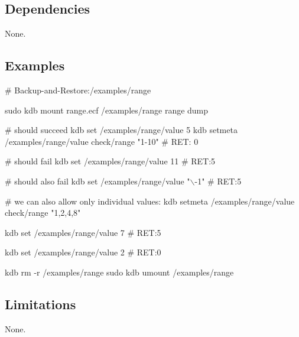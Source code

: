 \subsection*{Dependencies}

None.

\subsection*{Examples}


\begin{DoxyCode}
# Backup-and-Restore:/examples/range

sudo kdb mount range.ecf /examples/range range dump

# should succeed
kdb set /examples/range/value 5
kdb setmeta /examples/range/value check/range "1-10"
# RET: 0

# should fail
kdb set /examples/range/value 11
# RET:5

# should also fail
kdb set /examples/range/value "\(\backslash\)-1"
# RET:5

# we can also allow only individual values:
kdb setmeta /examples/range/value check/range "1,2,4,8"

kdb set /examples/range/value 7
# RET:5

kdb set /examples/range/value 2
# RET:0

kdb rm -r /examples/range
sudo kdb umount /examples/range
\end{DoxyCode}


\subsection*{Limitations}

None. 
